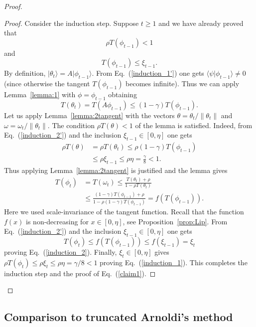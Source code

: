 \documentclass[
  reprint,            %
  amsmath,amssymb,
  aps,
  superscriptaddress, %
  longbibliography
]{revtex4-2}
\theoremstyle{definition}
\newcommand{\la}{\langle}
\newcommand{\ra}{\rangle}
\newcommand{\be}{\begin{equation}}
\newcommand{\ee}{\end{equation}}
\begin{document}
\begin{proof}
\begin{proof}
Consider the induction step. Suppose  $t\ge 1$ and we have already proved that 
\be
\label{induction_1'}
\rho T(\phi_{t-1})<1
\ee
and
\be
\label{induction_2'}
T(\phi_{t-1}) \le \xi_{t-1}.
\ee
By definition,  $|\theta_{t}\ra = A|\phi_{t-1}\ra$.
From Eq.~(\ref{induction_1'}) one gets $\la \psi|\phi_{t-1}\ra\ne 0$ 
(since otherwise the tangent $T(\phi_{t-1})$ becomes infinite).
Thus we can apply Lemma~\ref{lemma:1} with 
$\phi=\phi_{t-1}$ obtaining 
\be
T(\theta_t) = T(A\phi_{t-1}) \le (1-\gamma)T(\phi_{t-1}).
\ee
Let us apply Lemma~\ref{lemma:2tangent} with the vectors
$\theta=\theta_t/\|\theta_t\|$ and 
$\omega=\omega_t/\|\theta_t\|$. The condition $\rho T(\theta)<1$
of the lemma is satisfied. Indeed, from  Eq.~(\ref{induction_2'}) 
and the inclusion $\xi_{t-1}\in [0,\eta]$
one gets
\begin{align*}
\rho T(\theta)& =\rho T(\theta_t) \le \rho (1-\gamma) T(\phi_{t-1})\\
& 
\le
 \rho \xi_{t-1}
\le
 \rho \eta = \frac{\gamma}8 <1.
\end{align*}
Thus applying Lemma~\ref{lemma:2tangent} is justified and the lemma gives
\begin{align*}
T(\phi_t)& =T(\omega_t) \le \frac{T(\theta_t) + \rho}{1-\rho T(\theta_t)} \\
&  \le \frac{(1-\gamma) T(\phi_{t-1}) + \rho}{1-\rho (1-\gamma)T(\phi_{t-1})}
=f(T(\phi_{t-1})).
\end{align*}
Here we used scale-invariance of the tangent function.
Recall that the function $f(x)$ is non-decreasing for $x\in [0,\eta]$, see Proposition~\ref{prop:Lip}.
From Eq.~(\ref{induction_2'}) and the inclusion $\xi_{t-1}\in [0,\eta]$ one gets
\[
T(\phi_t) \le f(T(\phi_{t-1}))\le f(\xi_{t-1}) = \xi_t
\]
proving Eq.~(\ref{induction_2}). Finally, $\xi_t \in [0,\eta]$
gives $\rho T(\phi_t) \le \rho \xi_t \le \rho \eta =\gamma/8<1$ proving Eq.~(\ref{induction_1}).
This completes the induction step and the proof of Eq.~(\ref{claim1}).

\end{proof}

\end{proof}

\subsection{Comparison to truncated Arnoldi's method}
\label{sapp:comparison_tarn}
\end{document}
